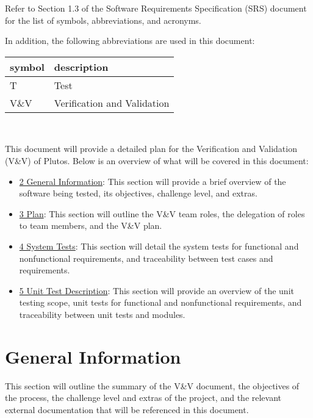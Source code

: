 \documentclass[12pt, titlepage]{article}
\begin{document}
Refer to Section 1.3 of the Software Requirements Specification (SRS) document
for the list of symbols, abbreviations, and acronyms.

In addition, the following abbreviations are used in this document:\\

\renewcommand{\arraystretch}{1.2}
\begin{tabular}{l l} 
  \toprule		
  \textbf{symbol} & \textbf{description}\\
  \midrule 
  T & Test\\
  V\&V & Verification and Validation\\
  \bottomrule
\end{tabular}\\

\newpage


This document will provide a detailed plan for the Verification and Validation
(V\&V) of Plutos. Below is an overview of what will be covered in this document:
\begin{itemize}
	\item \hyperlink{section.2}{2 General Information}: This section will provide a brief overview of
	the software being tested, its objectives, challenge level, and extras.
	\item \hyperlink{section.3}{3 Plan}: This section will outline the V\&V team roles, the delegation
	of roles to team members, and the V\&V plan.
	\item \hyperlink{section.4}{4 System Tests}: This section will detail the system tests for
	functional and nonfunctional requirements, and traceability between test
	cases and requirements.
	\item \hyperlink{section.5}{5 Unit Test Description}: This section will provide an overview of the
	unit testing scope, unit tests for functional and nonfunctional
	requirements, and traceability between unit tests and modules.
\end{itemize}


\newpage

\section{General Information}

This section will outline the summary of the V\&V document, the objectives of
the process, the challenge level and extras of the project, and the relevant
external documentation that will be referenced in this document.
\end{document}
